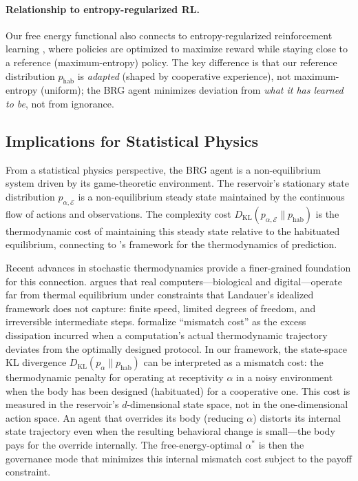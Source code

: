 \documentclass[11pt,a4paper]{article}
\theoremstyle{definition}
\newcommand{\KL}{D_{\mathrm{KL}}}
\begin{document}
\paragraph{Relationship to entropy-regularized RL.}
Our free energy functional also connects to entropy-regularized
reinforcement learning \citep{haarnoja2018}, where policies are optimized
to maximize reward while staying close to a reference (maximum-entropy)
policy.  The key difference is that our reference distribution
$p_{\mathrm{hab}}$ is \emph{adapted} (shaped by cooperative experience),
not maximum-entropy (uniform); the BRG agent minimizes deviation from
\emph{what it has learned to be}, not from ignorance.

\subsection{Implications for Statistical Physics}

From a statistical physics perspective, the BRG agent is a non-equilibrium
system driven by its game-theoretic environment.  The reservoir's stationary
state distribution $p_{\alpha,\mathcal{E}}$ is a non-equilibrium steady state
maintained by the continuous flow of actions and observations.  The
complexity cost $\KL(p_{\alpha,\mathcal{E}} \| p_{\mathrm{hab}})$ is the
thermodynamic cost of maintaining this steady state relative to the
habituated equilibrium, connecting to \citet{still2012}'s framework for
the thermodynamics of prediction.

Recent advances in stochastic thermodynamics provide a finer-grained
foundation for this connection.  \citet{wolpert2024} argues that real
computers---biological and digital---operate far from thermal equilibrium
under constraints that Landauer's idealized framework does not capture:
finite speed, limited degrees of freedom, and irreversible intermediate
steps.  \citet{manzano2024} formalize ``mismatch cost'' as the excess
dissipation incurred when a computation's actual thermodynamic trajectory
deviates from the optimally designed protocol.  In our framework, the
state-space KL divergence $\KL(p_{\alpha} \| p_{\mathrm{hab}})$ can be
interpreted as a mismatch cost: the thermodynamic penalty for operating
at receptivity $\alpha$ in a noisy environment when the body has been
designed (habituated) for a cooperative one.  This cost is
measured in the reservoir's $d$-dimensional state space, not in the
one-dimensional action space.  An agent that overrides its body
(reducing $\alpha$) distorts its internal state trajectory even when
the resulting behavioral change is small---the body pays for the
override internally.
The free-energy-optimal $\alpha^{*}$ is then the
governance mode that minimizes this internal mismatch cost subject to the
payoff constraint.
\end{document}
